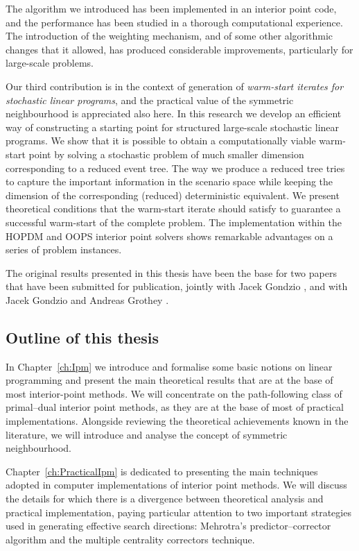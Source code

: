 The algorithm we introduced has been implemented in an interior
point code, and the performance has been studied in a thorough
computational experience. The introduction of the weighting mechanism,
and of some other algorithmic changes that it allowed,
has produced considerable improvements, particularly for large-scale
problems.

Our third contribution is in the context of generation of 
{\em warm-start iterates for stochastic linear programs}, 
and the practical value of the 
symmetric neighbourhood is appreciated also here.
In this research we develop an
efficient way of constructing a starting point for structured 
large-scale stochastic linear programs.
We show that it is possible to obtain a computationally viable
warm-start point by solving a stochastic problem of much smaller
dimension corresponding to a reduced event tree.
The way we produce a reduced tree tries to capture the 
important information in the scenario space while keeping 
the dimension of the corresponding (reduced) deterministic equivalent. 
We present theoretical conditions that the warm-start iterate
should satisfy to guarantee a successful warm-start of the complete 
problem. 
The implementation within the HOPDM and OOPS interior point solvers 
shows remarkable advantages on a series of problem instances.

The original results presented in this thesis have been the base for two
papers that have been submitted for publication, jointly with
Jacek Gondzio \cite{ColomboGondzio05}, and with Jacek Gondzio and 
Andreas Grothey \cite{ColomboGondzioGrothey06}.

%
%
\subsection{Outline of this thesis}

In Chapter~\ref{ch:Ipm} we introduce and formalise some basic
notions on linear programming and present the main theoretical results 
that are at the base of most interior-point methods. 
We will concentrate on the path-following class of
primal--dual interior point methods, as they are at the base of 
most of practical implementations.
Alongside reviewing the theoretical achievements known in the
literature, we will introduce and analyse the concept of 
symmetric neighbourhood.

Chapter~\ref{ch:PracticalIpm} is dedicated to presenting
the main techniques adopted in computer implementations of
interior point methods.
We will discuss the details for which there is a divergence 
between theoretical analysis and practical implementation,
paying particular attention to two important strategies used 
in generating effective search directions: 
Mehrotra's predictor--corrector algorithm and the
multiple centrality correctors technique.

